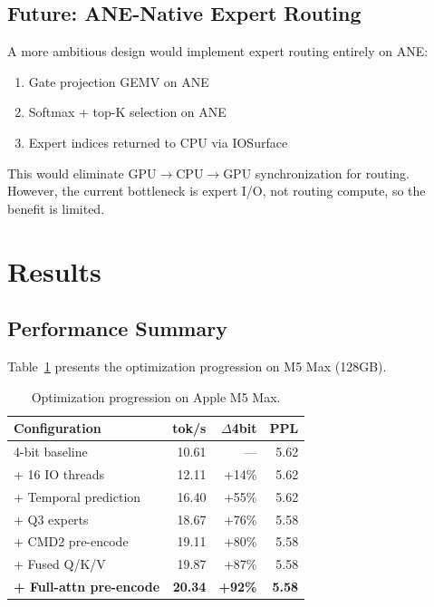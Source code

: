 \documentclass[11pt,twocolumn]{article}
\begin{document}
\subsection{Future: ANE-Native Expert Routing}

A more ambitious design would implement expert routing entirely on ANE:
\begin{enumerate}
    \item Gate projection GEMV on ANE
    \item Softmax + top-K selection on ANE
    \item Expert indices returned to CPU via IOSurface
\end{enumerate}

This would eliminate GPU$\rightarrow$CPU$\rightarrow$GPU synchronization for routing. However, the current bottleneck is expert I/O, not routing compute, so the benefit is limited.

\vfill\pagebreak
\section{Results}

\subsection{Performance Summary}

Table~\ref{tab:results} presents the optimization progression on M5 Max (128GB).

\begin{table}[t]
\centering
\caption{Optimization progression on Apple M5 Max.}
\label{tab:results}
\begin{tabular}{lrrr}
\toprule
\textbf{Configuration} & \textbf{tok/s} & \textbf{$\Delta$4bit} & \textbf{PPL} \\
\midrule
4-bit baseline & 10.61 & --- & 5.62 \\
+ 16 IO threads & 12.11 & +14\% & 5.62 \\
+ Temporal prediction & 16.40 & +55\% & 5.62 \\
+ Q3 experts & 18.67 & +76\% & 5.58 \\
+ CMD2 pre-encode & 19.11 & +80\% & 5.58 \\
+ Fused Q/K/V & 19.87 & +87\% & 5.58 \\
\textbf{+ Full-attn pre-encode} & \textbf{20.34} & \textbf{+92\%} & \textbf{5.58} \\
\bottomrule
\end{tabular}
\end{table}
\end{document}
